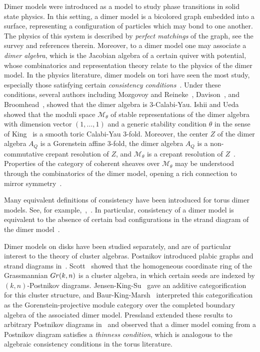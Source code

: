 \documentclass{article}
\theoremstyle{definition}
\begin{document}
Dimer models were introduced as a model to study phase transitions in solid state physics.
In this setting, a dimer model is a bicolored graph embedded into a surface, representing a configuration of particles which may bond to one another.
The physics of this system is described by \textit{perfect matchings} of the graph, see the survey \cite{Kenyon} and references therein.
Moreover, to a dimer model one may associate a \textit{dimer algebra}, which is the Jacobian algebra of a certain quiver with potential, whose combinatorics and representation theory relate to the physics of the dimer model.
In the physics literature, dimer models on tori have seen the most study, especially those satisfying certain \textit{consistency conditions}~\cite{XHV}. 
Under these conditions, several authors including Mozgovoy and Reineke~\cite{XMR},  Davison~\cite{XDavison}, and Broomhead~\cite{XBroomhead2009}, showed that the dimer algebra is 3-Calabi-Yau. 
Ishii and Ueda~\cite{XIU2007} showed that the moduli space $\mathcal M_\theta$ of stable representations of the dimer algebra with dimension vector $(1,\dots,1)$ and a generic stability condition $\theta$ in the sense of King~\cite{XKing} is a smooth toric Calabi-Yau 3-fold. 
Moreover, the center $Z$ of the dimer algebra $A_Q$ is a Gorenstein affine 3-fold, 
the dimer algebra $A_Q$ is a non-commutative crepant resolution of $Z$, and $\mathcal M_\theta$ is a crepant resolution of $Z$~\cite{XIU2007}.
{Properties of the category of coherent sheaves over $\mathcal M_\theta$ may be understood through the combinatorics of the dimer model, opening a rich connection to mirror symmetry~\cite{XBocklandt2015,XBocklandt2013,FHKVW,XFU}.}

Many equivalent definitions of consistency have been introduced for torus dimer models. See, for example,~\cite[Theorem 10.2]{XBocklandt2011},~\cite{XBocklandt2009,XBroomhead2009,Kennaway,XMR}.
In particular, consistency of a dimer model is equivalent to the absence of certain bad configurations in the strand diagram of the dimer model~\cite[Theorem 1.37]{XBocklandt2015}. 

Dimer models on disks have been studied separately, and are of particular interest to the theory of cluster algebras. Postnikov introduced plabic graphs and strand diagrams in~\cite{Postnikov}. Scott~\cite{XScott} showed that the homogeneous coordinate ring of the Grassmannian $\textup{Gr}(k,n)$ is a cluster algebra, in which certain seeds are indexed by $(k,n)$-Postnikov diagrams.
Jensen-King-Su~\cite{XJKS} gave an additive categorification for this cluster structure, and Baur-King-Marsh~\cite{BKMX} interpreted this categorification as the Gorenstein-projective module category over the completed boundary algebra of the associated dimer model. Pressland extended these results to arbitrary Postnikov diagrams in~\cite{XPressland2019} and observed that a dimer model coming from a Postnikov diagram satisfies a \textit{thinness condition}, which is analogous to the algebraic consistency conditions in the torus literature.
\end{document}
